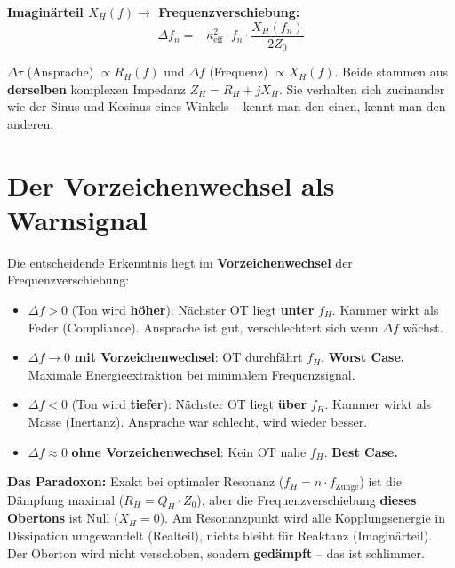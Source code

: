 \documentclass[11pt,a4paper]{article}
\begin{document}
\textbf{Imaginärteil $X_H(f) \to$ Frequenzverschiebung:}
\begin{equation}
\Delta f_n = -\kappa_\text{eff}^2 \cdot f_n \cdot \frac{X_H(f_n)}{2 Z_0}
\end{equation}

\begin{keybox}
$\Delta\tau$ (Ansprache) $\propto R_H(f)$ und $\Delta f$ (Frequenz) $\propto X_H(f)$. Beide stammen aus \textbf{derselben} komplexen Impedanz $Z_H = R_H + jX_H$. Sie verhalten sich zueinander wie der Sinus und Kosinus eines Winkels -- kennt man den einen, kennt man den anderen.
\end{keybox}

\section{Der Vorzeichenwechsel als Warnsignal}

Die entscheidende Erkenntnis liegt im \textbf{Vorzeichenwechsel} der Frequenzverschiebung:

\begin{itemize}[leftmargin=5mm, itemsep=4pt]
\item $\Delta f > 0$ (Ton wird \textbf{höher}): Nächster OT liegt \textbf{unter} $f_H$. Kammer wirkt als Feder (Compliance). Ansprache ist gut, verschlechtert sich wenn $\Delta f$ wächst.
\item $\Delta f \to 0$ \textbf{mit Vorzeichenwechsel}: OT durchfährt $f_H$. \textbf{Worst Case.} Maximale Energieextraktion bei minimalem Frequenzsignal.
\item $\Delta f < 0$ (Ton wird \textbf{tiefer}): Nächster OT liegt \textbf{über} $f_H$. Kammer wirkt als Masse (Inertanz). Ansprache war schlecht, wird wieder besser.
\item $\Delta f \approx 0$ \textbf{ohne Vorzeichenwechsel}: Kein OT nahe $f_H$. \textbf{Best Case.}
\end{itemize}

\begin{warnbox}
\textbf{Das Paradoxon:} Exakt bei optimaler Resonanz ($f_H = n \cdot f_\text{Zunge}$) ist die Dämpfung maximal ($R_H = Q_H \cdot Z_0$), aber die Frequenzverschiebung \textbf{dieses Obertons} ist Null ($X_H = 0$). Am Resonanzpunkt wird alle Kopplungsenergie in Dissipation umgewandelt (Realteil), nichts bleibt für Reaktanz (Imaginärteil). Der Oberton wird nicht verschoben, sondern \textbf{gedämpft} -- das ist schlimmer.
\end{warnbox}
\end{document}
